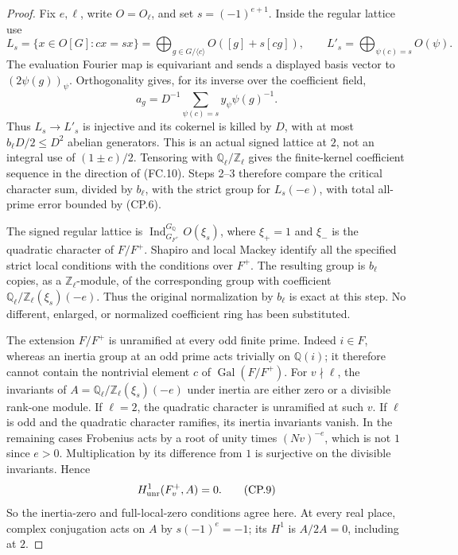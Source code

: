 \begin{proof}
Fix $e,\ell$, write $O=O_\ell$, and set $s=(-1)^{e+1}$.
Inside the regular lattice use
\[
 L_s=\{x\in O[G]:cx=sx\}
       =\bigoplus_{g\in G/\langle c\rangle}O([g]+s[cg]),
 \qquad
 L'_s=\bigoplus_{\psi(c)=s}O(\psi).                                \tag{CP.7}
\]
The evaluation Fourier map is equivariant and sends a displayed
basis vector to $(2\psi(g))_\psi$.  Orthogonality gives, for its
inverse over the coefficient field,
\[
          a_g=D^{-1}\sum_{\psi(c)=s}y_\psi\psi(g)^{-1}.
                                                                  \tag{CP.8}
\]
Thus $L_s\to L'_s$ is injective and its cokernel is killed by
$D$, with at most $b_\ell D/2\leq D^2$ abelian generators.
This is an actual signed lattice at $2$, not an integral use of
$(1\pm c)/2$.  Tensoring with $\mathbb Q_\ell/\mathbb Z_\ell$
gives the finite-kernel coefficient sequence in the direction
of (FC.10).  Steps 2--3 therefore compare the critical character
sum, divided by $b_\ell$, with the strict group for $L_s(-e)$,
with total all-prime error bounded by (CP.6).

The signed regular lattice is
$\operatorname{Ind}_{G_{F^+}}^{G_{\mathbb Q}}O(\xi_s)$, where
$\xi_+=1$ and $\xi_-$ is the quadratic character of $F/F^+$.
Shapiro and local Mackey identify all the specified strict
local conditions with the conditions over $F^+$.
The resulting group is $b_\ell$ copies, as a
$\mathbb Z_\ell$-module, of the corresponding group with
coefficient $\mathbb Q_\ell/\mathbb Z_\ell(\xi_s)(-e)$.
Thus the original normalization by $b_\ell$ is exact at this
step.  No different, enlarged, or normalized coefficient ring
has been substituted.

The extension $F/F^+$ is unramified at every odd finite prime.
Indeed $i\in F$, whereas an inertia group at an odd prime acts
trivially on $\mathbb Q(i)$; it therefore cannot contain the
nontrivial element $c$ of $\operatorname{Gal}(F/F^+)$.
For $v\nmid\ell$, the invariants of
$A=\mathbb Q_\ell/\mathbb Z_\ell(\xi_s)(-e)$ under inertia are
either zero or a divisible rank-one module.  If $\ell=2$, the
quadratic character is unramified at such $v$.  If $\ell$ is
odd and the quadratic character ramifies, its inertia
invariants vanish.  In the remaining cases Frobenius acts by
a root of unity times $(Nv)^{-e}$, which is not $1$ since
$e>0$.  Multiplication by its difference from $1$ is surjective
on the divisible invariants.  Hence
\[
                    H^1_{\rm unr}(F^+_v,A)=0.                    \tag{CP.9}
\]
So the inertia-zero and full-local-zero conditions agree here.
At every real place, complex conjugation acts on $A$ by
$s(-1)^e=-1$; its $H^1$ is $A/2A=0$, including at $2$.


\end{proof}
